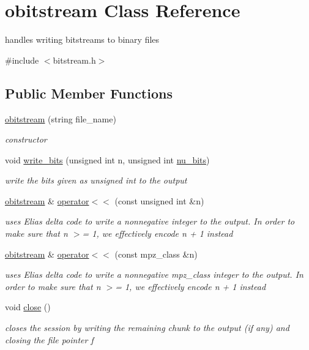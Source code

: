 \hypertarget{classobitstream}{}\section{obitstream Class Reference}
\label{classobitstream}


handles writing bitstreams to binary files  




{\ttfamily \#include $<$bitstream.\+h$>$}

\subsection*{Public Member Functions}
\begin{DoxyCompactItemize}
\item 
\hyperlink{classobitstream_a99e4f20344a99c1e8d892eb0c28b3daa}{obitstream} (string file\+\_\+name)
\begin{DoxyCompactList}\small\item\em constructor \end{DoxyCompactList}\item 
void \hyperlink{classobitstream_afb0cc2fb4f739881436d887bd4770355}{write\+\_\+bits} (unsigned int n, unsigned int \hyperlink{bitstream_8h_a9dfce6f51e3febb3973aa3b16c2fecb4}{nu\+\_\+bits})
\begin{DoxyCompactList}\small\item\em write the bits given as unsigned int to the output \end{DoxyCompactList}\item 
\hyperlink{classobitstream}{obitstream} \& \hyperlink{classobitstream_a09352e38c7d1d5bcff438c0b8ba41ff4}{operator$<$$<$} (const unsigned int \&n)
\begin{DoxyCompactList}\small\item\em uses Elias delta code to write a nonnegative integer to the output. In order to make sure that n $>$= 1, we effectively encode n + 1 instead \end{DoxyCompactList}\item 
\hyperlink{classobitstream}{obitstream} \& \hyperlink{classobitstream_aed715e98e8b47e19e465da1445372229}{operator$<$$<$} (const mpz\+\_\+class \&n)
\begin{DoxyCompactList}\small\item\em uses Elias delta code to write a nonnegative mpz\+\_\+class integer to the output. In order to make sure that n $>$= 1, we effectively encode n + 1 instead \end{DoxyCompactList}\item 
void \hyperlink{classobitstream_a6d76dbba302e1181fbc9609072a4c2a0}{close} ()
\begin{DoxyCompactList}\small\item\em closes the session by writing the remaining chunk to the output (if any) and closing the file pointer f \end{DoxyCompactList}\end{DoxyCompactItemize}
